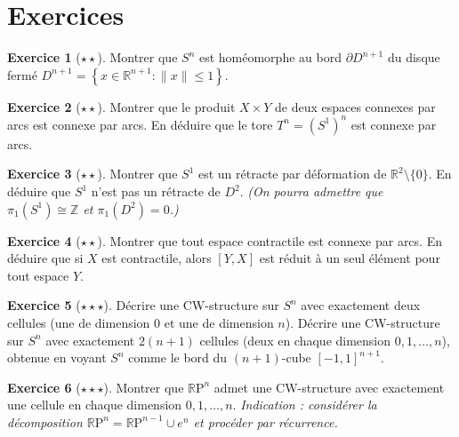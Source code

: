 \documentclass[12pt,a4paper,openany]{book}
\theoremstyle{definition}
\newtheorem{exercice}{Exercice}[chapter]
\theoremstyle{plain}
\theoremstyle{remark}
\newcommand{\Z}{\mathbb{Z}}
\newcommand{\R}{\mathbb{R}}
\newcommand{\RP}{\mathbb{R}\mathrm{P}}
\newcommand{\set}[1]{\left\{#1\right\}}
\begin{document}
\section{Exercices}\label{sec:exos-ch1}

\begin{exercice}[$\star\star$]\label{exo:homeo-sphere-bord}
Montrer que $S^n$ est homéomorphe au bord $\partial D^{n+1}$ du disque fermé
$D^{n+1} = \set{x \in \R^{n+1} : \|x\| \leqslant 1}$.
\end{exercice}

\begin{exercice}[$\star\star$]\label{exo:produit-connexes}
Montrer que le produit $X \times Y$ de deux espaces connexes par arcs est connexe
par arcs. En déduire que le tore $T^n = (S^1)^n$ est connexe par arcs.
\end{exercice}

\begin{exercice}[$\star\star$]\label{exo:retracte-S1}
Montrer que $S^1$ est un rétracte par déformation de
$\R^2 \setminus \{0\}$. En déduire que $S^1$ n'est pas un rétracte de $D^2$.
\emph{(On pourra admettre que $\pi_1(S^1) \cong \Z$ et $\pi_1(D^2) = 0$.)}
\end{exercice}

\begin{exercice}[$\star\star$]\label{exo:contractile-pi1}
Montrer que tout espace contractile est connexe par arcs. En déduire que si $X$
est contractile, alors $[Y, X]$ est réduit à un seul élément pour tout espace $Y$.
\end{exercice}

\begin{exercice}[$\star\star\star$]\label{exo:CW-Sn}
Décrire une CW-structure sur $S^n$ avec exactement deux cellules (une de dimension
$0$ et une de dimension $n$). Décrire une CW-structure sur $S^n$ avec exactement
$2(n+1)$ cellules (deux en chaque dimension $0, 1, \ldots, n$), obtenue en
voyant $S^n$ comme le bord du $(n+1)$-cube $[-1,1]^{n+1}$.
\end{exercice}

\begin{exercice}[$\star\star\star$]\label{exo:CW-RPn}
Montrer que $\RP^n$ admet une CW-structure avec exactement une cellule en chaque
dimension $0, 1, \ldots, n$. \emph{Indication : considérer la décomposition
$\RP^n = \RP^{n-1} \cup e^n$ et procéder par récurrence.}
\end{exercice}
\end{document}
